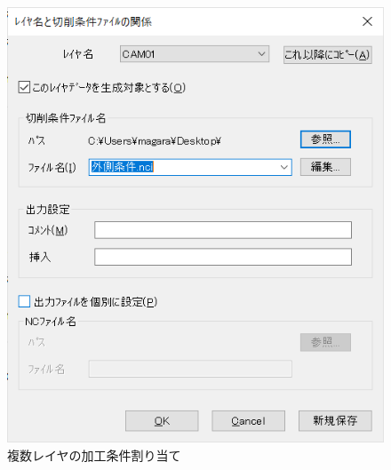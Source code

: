 \begin{figure}[H]
\centering
\includegraphics[scale=0.7]{No3/fig/25d-make5.png}
\caption{複数レイヤの加工条件割り当て}
\label{fig:25d-make5.png}
\end{figure}
